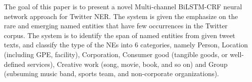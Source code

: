 %

The goal of this paper is to present a novel Multi-channel BiLSTM-CRF neural network approach for Twitter NER. The system is given the emphasize on the rare and emerging named entities that have few occurrences in the Twitter corpus. The system is to identify the span of named entities from given tweet texts, and classify the type of the NEs into 6 categories, namely Person, Location (including GPE, facility), Corporation, Consumer good (tangible goods, or well-defined services), Creative work (song, movie, book, and so on) and Group (subsuming music band, sports team, and non-corporate organizations).


